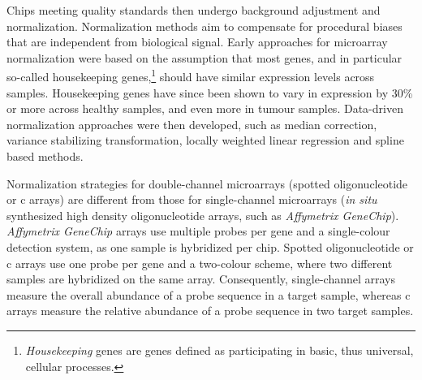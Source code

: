 Chips meeting quality standards then undergo background adjustment and
normalization.  Normalization methods aim to compensate for procedural biases
that are independent from biological signal.  Early approaches for microarray
normalization were based on the assumption that most genes, and in particular
so-called housekeeping genes,\footnote{\emph{Housekeeping} genes are genes
  defined as participating in basic, thus universal, cellular processes.}
should have similar expression levels across samples.  Housekeeping genes have
since been shown to vary in expression by 30\% or more across healthy samples,
and even more in tumour samples.\cite{lee_control_2002,eisenberg_human_2003}
Data-driven normalization approaches were then developed, such as median
correction,\cite{cho_genome-wide_1998,selinger_rna_2000} variance stabilizing
transformation,\cite{durbin_variance-stabilizing_2002} locally weighted linear
regression\cite{yang_normalization_2002} and spline based
methods.\cite{workman_new_2002} %

Normalization strategies for double-channel microarrays (spotted oligonucleotide
or c arrays\cite{schena_quantitative_1995}) are different from
those for single-channel microarrays (\emph{in situ} synthesized high density
oligonucleotide arrays,\cite{lockhart_expression_1996} such as \emph{Affymetrix
  GeneChip}).  \emph{Affymetrix GeneChip} arrays use multiple probes per gene
and a single-colour detection system, as one sample is hybridized per chip.
Spotted oligonucleotide or c arrays use one probe per gene and a
two-colour scheme, where two different samples are hybridized on the same array.
Consequently, single-channel arrays measure the overall abundance of a probe
sequence in a target sample, whereas c arrays measure the
relative abundance of a probe sequence in two target samples.

